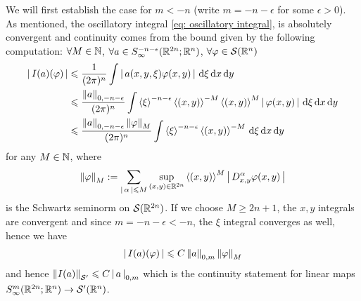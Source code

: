 \documentclass[12pt]{article}
\begin{document}
We will first establish the case for $m < -n$ (write $m = -n - \epsilon$ for some $\epsilon > 0$). As mentioned, the oscillatory integral \ref{eq: oscillatory integral}, is absolutely convergent and continuity comes from the bound given by the following computation: $\forall M \in \N$, $\forall a \in S^{-n -\epsilon}_\infty(\R^{2n}; \R^n)$, $\forall \varphi \in \sch(\R^n)$ 
\begin{align*}
    \abs{I(a)(\varphi)}
    & \leq \frac{1}{(2\pi)^n} \int \abs{a(x, y, \xi) \varphi(x, y)} \d[\xi] \d[x] \d[y]\\
    & \leq \frac{\norm[a]_{0, -n -\epsilon}}{(2\pi)^n} \int \sym[\xi]^{-n -\epsilon} \sym[(x, y)]^{-M} \sym[(x, y)]^{M} \abs{\varphi(x, y)} \d[\xi] \d[x] \d[y]\\
    & \leq \frac{\norm[a]_{0, -n -\epsilon} \norm[\varphi]_M}{(2\pi)^n} \int \sym[\xi]^{-n -\epsilon} \sym[(x, y)]^{-M}  \d[\xi] \d[x] \d[y]\\
\end{align*}
for any $M \in \N$, where 
\begin{align} \label{eq: Schwartz seminorm} 
    \norm[\varphi]_M :=  \sum_{\abs{\alpha} \leq M}  \sup_{(x, y) \in \R^{2n}} \sym[(x, y)]^M \abs{D^{\alpha}_{x, y} \varphi(x, y)}
\end{align}
is the Schwartz  seminorm on $\sch(\R^{2n})$. If we choose $M \geq 2n +1$, the $x, y$ integrals are convergent and since $m = -n -\epsilon < -n$, the $\xi$ integral converges as well, hence we have 
\begin{align*}
    \abs{I(a)(\varphi)} \leq C \norm[a]_{0, m} \norm[\varphi]_M
\end{align*}
and hence $\norm[I(a)]_{\sch'} \leq C \abs{a}_{0, m}$ which is the continuity statement for linear maps $S^{m}_{\infty}(\R^{2n}; \R^{n}) \to \sch'(\R^n)$. 
\end{document}
